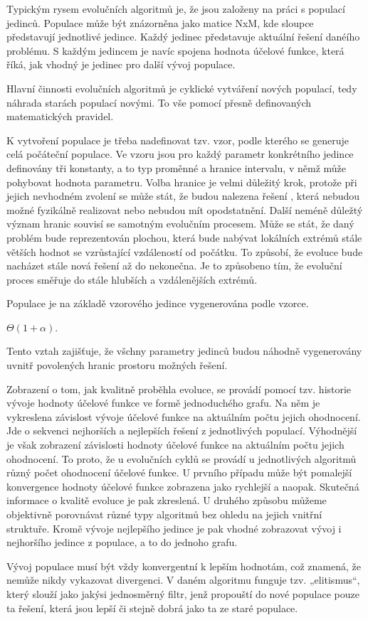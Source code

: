 \documentclass[bc,male,java,dept460]{diploma}		%
\begin{document}
\par Typickým rysem evolučních algoritmů je, že jsou založeny na práci s populací jedinců. Populace může být znázorněna jako matice NxM, kde sloupce představují jednotlivé jedince. Každý jedinec představuje aktuální řešení danéího problému. S každým jedincem je navíc spojena hodnota účelové funkce, která říká, jak vhodný je jedinec pro další vývoj populace.
\par Hlavní činnosti evolučních algoritmů je cyklické vytváření nových populací, tedy náhrada starách populací novými. To vše pomocí přesně definovaných matematických pravidel.
\par K vytvoření populace je třeba nadefinovat tzv. vzor, podle kterého se generuje celá počáteční populace. Ve vzoru jsou pro každý parametr konkrétního jedince definovány tři konstanty, a to typ proměnné a hranice intervalu, v němž může pohybovat hodnota parametru. Volba hranice je velmi důležitý krok, protože při jejich nevhodném zvolení se může stát, že budou nalezena řešení , která nebudou možné fyzikálně realizovat nebo nebudou mít opodstatnění. 
Další neméně důležtý význam hranic souvisí se samotným evolučním procesem. Může se stát, že daný problém bude reprezentován plochou, která bude nabývat lokálních extrémů stále větších hodnot se vzrůstající vzdáleností od počátku. To způsobí, že evoluce bude nacházet stále nová řešení až do nekonečna. Je to způsobeno tím, že evoluční proces směřuje do stále hlubších a vzdálenějších extrémů.
\par Populace je na základě vzorového jedince vygenerována podle vzorce.

$\Theta(1+\alpha)$.  

\par Tento vztah zajišťuje, že všchny parametry jedinců budou náhodně vygenerovány uvnitř povolených hranic prostoru možných řešení.
\par Zobrazení o tom, jak kvalitně proběhla evoluce, se provádí pomocí tzv. historie vývoje hodnoty účelové funkce ve formě jednoduchého grafu. Na něm je vykreslena závislost vývoje účelové funkce na aktuálním počtu jejich ohodnocení. Jde o sekvenci nejhorších a nejlepších řešení z jednotlivých populací. Výhodnější je však zobrazení závislosti hodnoty účelové funkce na aktuálním počtu jejich ohodnocení. To proto, že u evolučních cyklů se provádí u jednotlivých algoritmů různý počet ohodnocení účelové funkce. U prvního případu může být pomalejší konvergence hodnoty účelové funkce zobrazena jako rychlejší a naopak. Skutečná informace o kvalitě evoluce je pak zkreslená. U druhého způsobu můžeme objektivně porovnávat různé typy algoritmů bez ohledu na jejich vnitřní struktuře.
Kromě vývoje nejlepšího jedince je pak vhodné zobrazovat vývoj i nejhoršího jedince z populace, a to do jednoho grafu.
\par Vývoj populace musí být vždy konvergentní k lepším hodnotám, což znamená, že nemůže nikdy vykazovat divergenci. V daném algoritmu funguje tzv. „elitismus“, který slouží jako jakýsi jednosměrný filtr, jenž propouští do nové populace pouze ta řešení, která jsou lepší či stejně dobrá jako ta ze staré populace.
\end{document}
